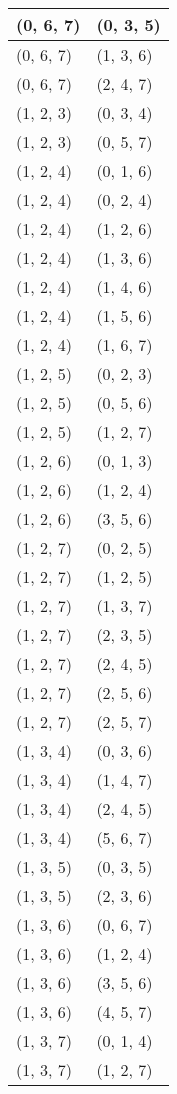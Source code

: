 \begin{footnotesize}
\begin{longtable}[c]{|l|l|}
(0, 6, 7)
&(0, 3, 5)
\\ \hline
(0, 6, 7)
&(1, 3, 6)
\\ \hline
(0, 6, 7)
&(2, 4, 7)
\\ \hline
(1, 2, 3)
&(0, 3, 4)
\\ \hline
(1, 2, 3)
&(0, 5, 7)
\\ \hline
(1, 2, 4)
&(0, 1, 6)
\\ \hline
(1, 2, 4)
&(0, 2, 4)
\\ \hline
(1, 2, 4)
&(1, 2, 6)
\\ \hline
(1, 2, 4)
&(1, 3, 6)
\\ \hline
(1, 2, 4)
&(1, 4, 6)
\\ \hline
(1, 2, 4)
&(1, 5, 6)
\\ \hline
(1, 2, 4)
&(1, 6, 7)
\\ \hline
(1, 2, 5)
&(0, 2, 3)
\\ \hline
(1, 2, 5)
&(0, 5, 6)
\\ \hline
(1, 2, 5)
&(1, 2, 7)
\\ \hline
(1, 2, 6)
&(0, 1, 3)
\\ \hline
(1, 2, 6)
&(1, 2, 4)
\\ \hline
(1, 2, 6)
&(3, 5, 6)
\\ \hline
(1, 2, 7)
&(0, 2, 5)
\\ \hline
(1, 2, 7)
&(1, 2, 5)
\\ \hline
(1, 2, 7)
&(1, 3, 7)
\\ \hline
(1, 2, 7)
&(2, 3, 5)
\\ \hline
(1, 2, 7)
&(2, 4, 5)
\\ \hline
(1, 2, 7)
&(2, 5, 6)
\\ \hline
(1, 2, 7)
&(2, 5, 7)
\\ \hline
(1, 3, 4)
&(0, 3, 6)
\\ \hline
(1, 3, 4)
&(1, 4, 7)
\\ \hline
(1, 3, 4)
&(2, 4, 5)
\\ \hline
(1, 3, 4)
&(5, 6, 7)
\\ \hline
(1, 3, 5)
&(0, 3, 5)
\\ \hline
(1, 3, 5)
&(2, 3, 6)
\\ \hline
(1, 3, 6)
&(0, 6, 7)
\\ \hline
(1, 3, 6)
&(1, 2, 4)
\\ \hline
(1, 3, 6)
&(3, 5, 6)
\\ \hline
(1, 3, 6)
&(4, 5, 7)
\\ \hline
(1, 3, 7)
&(0, 1, 4)
\\ \hline
(1, 3, 7)
&(1, 2, 7)
\\ \hline

\end{longtable}
\end{footnotesize}
